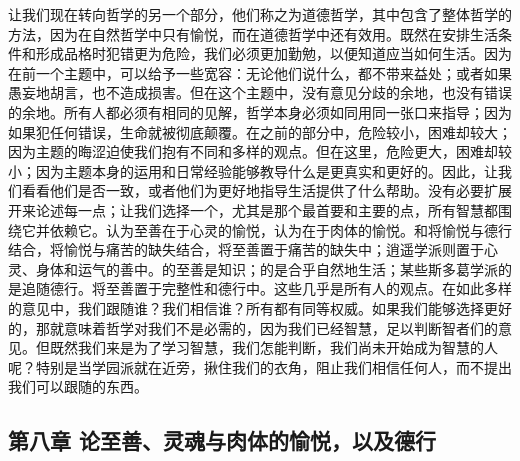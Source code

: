 让我们现在转向哲学的另一个部分，他们称之为道德哲学，其中包含了整体哲学的方法，因为在自然哲学中只有愉悦，而在道德哲学中还有效用。既然在安排生活条件和形成品格时犯错更为危险，我们必须更加勤勉，以便知道应当如何生活。因为在前一个主题中，可以给予一些宽容：无论他们说什么，都不带来益处；或者如果愚妄地胡言，也不造成损害。但在这个主题中，没有意见分歧的余地，也没有错误的余地。所有人都必须有相同的见解，哲学本身必须如同用同一张口来指导；因为如果犯任何错误，生命就被彻底颠覆。在之前的部分中，危险较小，困难却较大；因为主题的晦涩迫使我们抱有不同和多样的观点。但在这里，危险更大，困难却较小；因为主题本身的运用和日常经验能够教导什么是更真实和更好的。因此，让我们看看他们是否一致，或者他们为更好地指导生活提供了什么帮助。没有必要扩展开来论述每一点；让我们选择一个，尤其是那个最首要和主要的点，所有智慧都围绕它并依赖它。认为至善在于心灵的愉悦，认为在于肉体的愉悦。和将愉悦与德行结合，将愉悦与痛苦的缺失结合，将至善置于痛苦的缺失中；逍遥学派则置于心灵、身体和运气的善中。的至善是知识；的是合乎自然地生活；某些斯多葛学派的是追随德行。将至善置于完整性和德行中。这些几乎是所有人的观点。在如此多样的意见中，我们跟随谁？我们相信谁？所有都有同等权威。如果我们能够选择更好的，那就意味着哲学对我们不是必需的，因为我们已经智慧，足以判断智者们的意见。但既然我们来是为了学习智慧，我们怎能判断，我们尚未开始成为智慧的人呢？特别是当学园派就在近旁，揪住我们的衣角，阻止我们相信任何人，而不提出我们可以跟随的东西。\par


\subsection{第八章 论至善、灵魂与肉体的愉悦，以及德行}

